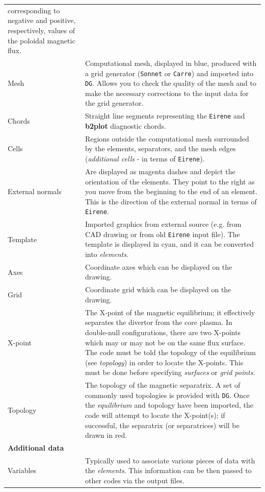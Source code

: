 \documentclass[12pt]{report}
\newcommand{\btwoplot}{{\bf b2plot} }
\begin{document}
\begin{supertabular}{lp{300pt}}
corresponding to negative and positive, respectively, 
values of the poloidal magnetic flux. \\
Mesh                &
Computational mesh, displayed in blue, produced with a grid generator 
(\verb!Sonnet! or \verb!Carre!) and imported into \verb!DG!. 
Allows you to check the quality of the mesh and
to make the necessary corrections to the input data for the grid
generator. \\
Chords              &
Straight line segments representing the \verb!Eirene!
and \btwoplot diagnostic chords. \\
Cells               &
Regions outside the computational mesh surrounded by the elements,
separators, and the mesh edges (\textit{additional cells} - in terms of
\verb!Eirene!). \\
External normals    &
Are displayed as magenta dashes and depict the orientation of the elements. They 
point to the right as you move from the beginning to the end
of an element. This is the direction of the external normal in terms
of \verb!Eirene!. \\
Template            &
Imported graphics from external source (e.g. from CAD drawing or from
old \verb!Eirene! input file). The template is displayed in cyan, and it can
be converted into \textit{elements}. \\
Axes                &
Coordinate axes which can be displayed on the drawing. \\
Grid                &
Coordinate grid which can be displayed on the drawing. \\
X-point             & 
The X-point of the magnetic equilibrium; it effectively separates the divertor
from the core plasma.  In double-null configurations, there are two
X-points which may or may not be on the same flux surface.
The code must be told the topology of the equilibrium (see \textit{topology})
in order to locate the X-points.
This must be done before specifying \textit{surfaces} or 
\textit{grid points}.
 \\
Topology
 &  
The topology of the magnetic separatrix.  A set of commonly used topologies
is provided with \verb!DG!.  Once the \textit{equilibrium} and topology have been
imported, the code will attempt to locate the X-point(s); if successful, the
separatrix (or separatrices) will be drawn in red.
 \\
\textbf{Additional data}
 &  
~
 \\
 
Variables
 &  
Typically used to associate various pieces of data with the \textit{elements}.
This information can be then passed to 
other codes via the output files.
 \\
 

\end{supertabular}
\end{document}
